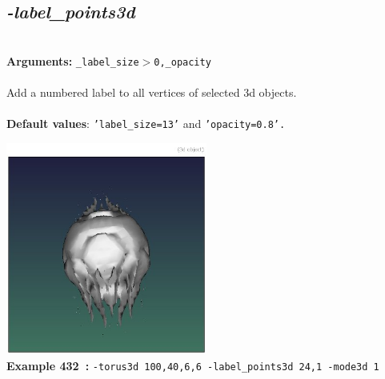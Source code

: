 \documentclass[a4paper,11pt,twoside]{book}
\begin{document}
\subsection{\emph{-label\_points3d} }\vspace*{-0.5em}
~\\\textbf{Arguments: } 
{\small \texttt{\_label\_size$>$0,\_opacity}}\\~\\
Add a numbered label to all vertices of selected 3d objects.
~\\~\\\textbf{Default values}: {\small \texttt{'label\_size=13'} and \texttt{'opacity=0.8'.}}
\begin{center}\includegraphics[keepaspectratio=true,height=7cm,width=\textwidth]{img/gmic_def432.jpg}\\
{\footnotesize \textbf{Example 432~:} \texttt{-torus3d 100,40,6,6 -label\_points3d 24,1 -mode3d 1}}
\end{center}
\end{document}
